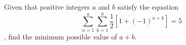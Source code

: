 Given that positive integers $a$ and $b$ satisfy the equation \[\sum^a_{n=1} \sum^b_{k=1}\dfrac{1}{2} [1 + (-1)^{n+k}] = 5\], find the minimum possible value of $a + b$.
